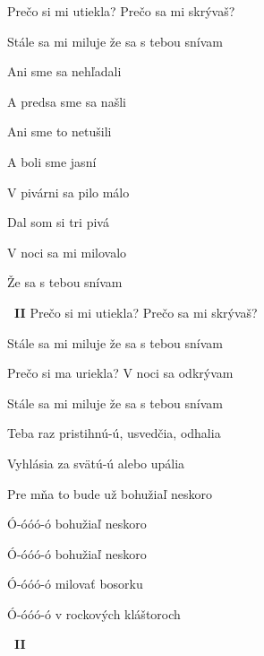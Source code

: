 \begin{song}
\bigskip

 Prečo si mi utiekla?   Prečo sa mi skrývaš?   \par
{}Stále sa mi miluje   že sa s tebou snívam  \par

\bigskip

Ani sme sa nehľadali  \par
{} A predsa sme sa našli   \par
{}Ani sme to netušili  \par
A boli sme jasní   \par

\bigskip

 V pivárni sa pilo málo  \par
{} Dal som si tri pivá  \par
{}V noci sa mi milovalo  \par
Že sa s tebou snívam    \par

\bigskip

\begin{chorusbox}{\Refren\textbf{\ II}}
 Prečo si mi utiekla?   Prečo sa mi skrývaš?   \par
{}Stále sa mi miluje   že sa s tebou snívam  \par
{} Prečo si ma uriekla?   V noci sa odkrývam   \par
{}Stále sa mi miluje   že sa s tebou snívam  \par
\end{chorusbox}

\bigskip

 Teba raz pristihnú-ú, usvedčia, odhalia \par
{} Vyhlásia za svätú-ú alebo upália \par
{} Pre mňa to bude už  bohužiaľ neskoro \par
{} Ó-óóó-ó bohužiaľ neskoro \par
{} Ó-óóó-ó bohužiaľ neskoro \par
{} Ó-óóó-ó milovať bosorku \par
{} Ó-óóó-ó v rockových kláštoroch \par

\bigskip

\Refren\textbf{\ II} \par
{}

\end{song}